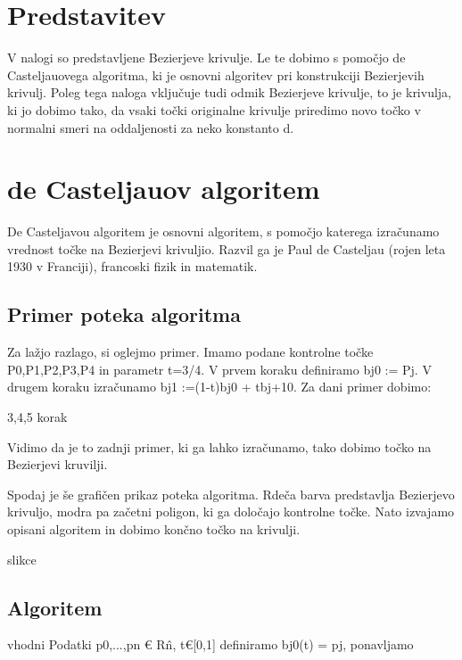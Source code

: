 \documentclass{article}
\begin{document}
\tableofcontents











\newpage

\section{Predstavitev}
V nalogi so predstavljene Bezierjeve krivulje. Le te dobimo s pomočjo de Casteljauovega algoritma, ki je osnovni algoritev pri konstrukciji Bezierjevih krivulj. Poleg tega naloga vključuje tudi odmik Bezierjeve krivulje, to je krivulja, ki jo dobimo tako, da vsaki točki originalne krivulje priredimo novo točko v normalni smeri na oddaljenosti za neko konstanto d.


\section{de Casteljauov algoritem}
De Casteljavou algoritem je osnovni algoritem, s pomočjo katerega izračunamo vrednost točke na Bezierjevi krivuljio.
Razvil ga je Paul de Casteljau (rojen leta 1930 v Franciji), francoski fizik in matematik.

\subsection{Primer poteka algoritma}
Za lažjo razlago, si oglejmo primer.
Imamo podane kontrolne točke P0,P1,P2,P3,P4 in parametr t=3/4.
V prvem koraku definiramo bj0 := Pj.
V drugem koraku izračunamo bj1 :=(1-t)bj0 + tbj+10.
Za dani primer dobimo:

3,4,5 korak

Vidimo da je to zadnji primer, ki ga lahko izračunamo, tako dobimo točko na Bezierjevi kruvilji.

Spodaj je še grafičen prikaz poteka algoritma. Rdeča barva predstavlja Bezierjevo krivuljo, modra pa začetni poligon, ki ga določajo kontrolne točke. Nato izvajamo opisani algoritem in dobimo končno točko na krivulji.


slikce


\subsection{Algoritem}
vhodni Podatki p0,...,pn € R\^n, t€[0,1]
definiramo bj0(t) = pj,
ponavljamo
\end{document}
